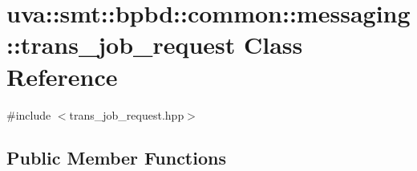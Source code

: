 \hypertarget{classuva_1_1smt_1_1bpbd_1_1common_1_1messaging_1_1trans__job__request}{}\section{uva\+:\+:smt\+:\+:bpbd\+:\+:common\+:\+:messaging\+:\+:trans\+\_\+job\+\_\+request Class Reference}
\label{classuva_1_1smt_1_1bpbd_1_1common_1_1messaging_1_1trans__job__request}


{\ttfamily \#include $<$trans\+\_\+job\+\_\+request.\+hpp$>$}

\subsection*{Public Member Functions}
